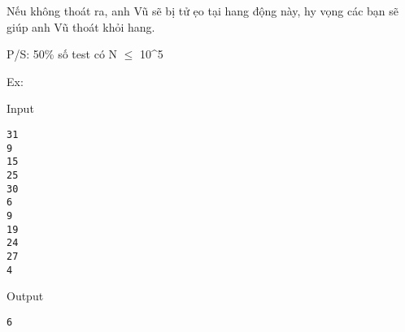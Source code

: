    Nếu không thoát ra, anh Vũ sẽ bị tử ẹo tại hang động này, hy vọng các bạn sẽ giúp anh Vũ thoát khỏi hang.  



            P/S:                50\% số test có N $\le$ 10^5  



            Ex:         



   Input  




\begin{verbatim}
31
9
15
25
30
6
9
19
24
27
4\end{verbatim}





   Output  




\begin{verbatim}
6\end{verbatim}

